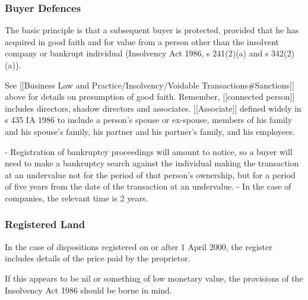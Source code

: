 \documentclass[
]{article}
\newenvironment{Shaded}{}{}
\newcommand{\NormalTok}[1]{#1}
\begin{document}
\hypertarget{buyer-defences}{%
\subsubsection{Buyer Defences}\label{buyer-defences}}

\begin{Shaded}
\begin{Highlighting}[]
\NormalTok{The basic principle is that a subsequent buyer is protected, provided that he has acquired in good faith and for value from a person other than the insolvent company or bankrupt individual (Insolvency Act 1986, s 241(2)(a) and s 342(2)(a)).}
\end{Highlighting}
\end{Shaded}

See {[}{[}Business Law and Practice/Insolvency/Voidable
Transactions\#Sanctions{]}{]} above for details on presumption of good
faith. Remember, {[}{[}connected person{]}{]} includes directors, shadow
directors and associates. {[}{[}Associate{]}{]} defined widely in s 435
IA 1986 to include a person's spouse or ex-spouse, members of his family
and his spouse's family, his partner and his partner's family, and his
employees.

\begin{Shaded}
\begin{Highlighting}[]
\NormalTok{{-} Registration of bankruptcy proceedings will amount to notice, so a buyer will need to make a bankruptcy search against the individual making the transaction at an undervalue not for the period of that person’s ownership, but for a period of five years from the date of the transaction at an undervalue.}
\NormalTok{{-} In the case of companies, the relevant time is 2 years. }
\end{Highlighting}
\end{Shaded}

\hypertarget{registered-land}{%
\subsubsection{Registered Land}\label{registered-land}}

In the case of dispositions registered on or after 1 April 2000, the
register includes details of the price paid by the proprietor.

\begin{Shaded}
\begin{Highlighting}[]
\NormalTok{If this appears to be nil or something of low monetary value, the provisions of the Insolvency Act 1986 should be borne in mind. }
\end{Highlighting}
\end{Shaded}
\end{document}
